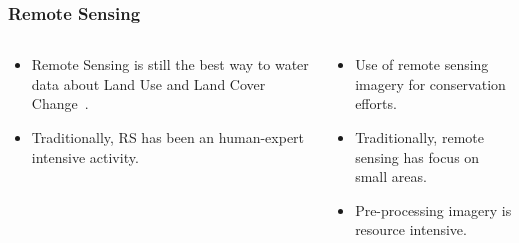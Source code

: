 \documentclass[aspectratio=169]{beamer}
\begin{document}
\begin{frame}
    \frametitle{Remote Sensing}
    \begin{columns}
        \begin{column}{0.5\textwidth}
            \begin{itemize}
                \item Remote Sensing is still the best way to water data about 
                    Land Use and Land Cover Change~\cite{picoli2018}.
                \item Traditionally, RS has been an human-expert intensive 
                    activity.
            \end{itemize}
        \end{column}
        \begin{column}{0.5\textwidth}
            \begin{itemize}
                \item Use of remote sensing imagery for conservation efforts. 
                \item Traditionally, remote sensing has focus on small areas.
                \item Pre-processing imagery is resource intensive.
            \end{itemize}
        \end{column}
    \end{columns}
\end{frame}



\end{document}
